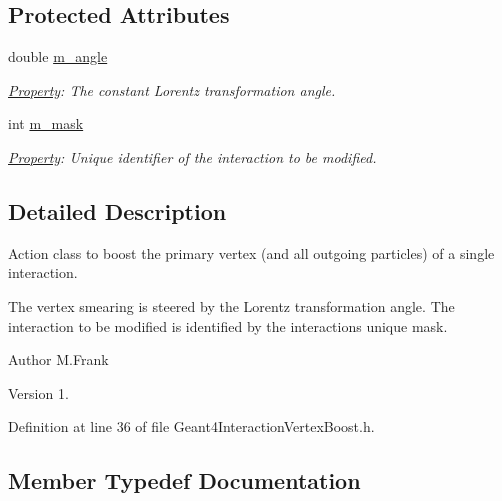 \subsection*{Protected Attributes}
\begin{DoxyCompactItemize}
\item 
double \hyperlink{class_d_d4hep_1_1_simulation_1_1_geant4_interaction_vertex_boost_a545bdd5e80a80a03f613c7f9bd2e3c6c}{m\+\_\+angle}
\begin{DoxyCompactList}\small\item\em \hyperlink{class_d_d4hep_1_1_property}{Property}\+: The constant Lorentz transformation angle. \end{DoxyCompactList}\item 
int \hyperlink{class_d_d4hep_1_1_simulation_1_1_geant4_interaction_vertex_boost_a6627def92b1b92c93ad455853c65f3c3}{m\+\_\+mask}
\begin{DoxyCompactList}\small\item\em \hyperlink{class_d_d4hep_1_1_property}{Property}\+: Unique identifier of the interaction to be modified. \end{DoxyCompactList}\end{DoxyCompactItemize}


\subsection{Detailed Description}
Action class to boost the primary vertex (and all outgoing particles) of a single interaction. 

The vertex smearing is steered by the Lorentz transformation angle. The interaction to be modified is identified by the interaction\textquotesingle{}s unique mask.

\begin{DoxyAuthor}{Author}
M.\+Frank 
\end{DoxyAuthor}
\begin{DoxyVersion}{Version}
1. 
\end{DoxyVersion}


Definition at line 36 of file Geant4\+Interaction\+Vertex\+Boost.\+h.



\subsection{Member Typedef Documentation}
\hypertarget{class_d_d4hep_1_1_simulation_1_1_geant4_interaction_vertex_boost_a24539ccb7908e132acaf99eeec5111e5}{}\label{class_d_d4hep_1_1_simulation_1_1_geant4_interaction_vertex_boost_a24539ccb7908e132acaf99eeec5111e5} 
